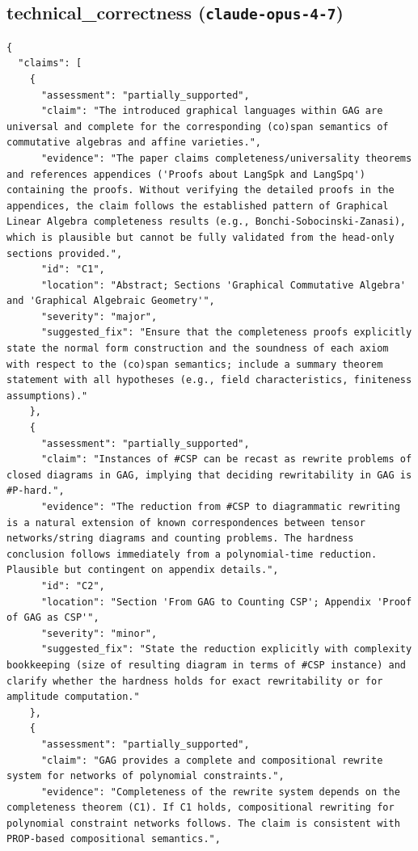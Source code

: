 \documentclass[11pt]{article}
\begin{document}
\subsection*{technical_correctness (\texttt{claude-opus-4-7})}
\begin{verbatim}
{
  "claims": [
    {
      "assessment": "partially_supported",
      "claim": "The introduced graphical languages within GAG are universal and complete for the corresponding (co)span semantics of commutative algebras and affine varieties.",
      "evidence": "The paper claims completeness/universality theorems and references appendices ('Proofs about LangSpk and LangSpq') containing the proofs. Without verifying the detailed proofs in the appendices, the claim follows the established pattern of Graphical Linear Algebra completeness results (e.g., Bonchi-Sobocinski-Zanasi), which is plausible but cannot be fully validated from the head-only sections provided.",
      "id": "C1",
      "location": "Abstract; Sections 'Graphical Commutative Algebra' and 'Graphical Algebraic Geometry'",
      "severity": "major",
      "suggested_fix": "Ensure that the completeness proofs explicitly state the normal form construction and the soundness of each axiom with respect to the (co)span semantics; include a summary theorem statement with all hypotheses (e.g., field characteristics, finiteness assumptions)."
    },
    {
      "assessment": "partially_supported",
      "claim": "Instances of #CSP can be recast as rewrite problems of closed diagrams in GAG, implying that deciding rewritability in GAG is #P-hard.",
      "evidence": "The reduction from #CSP to diagrammatic rewriting is a natural extension of known correspondences between tensor networks/string diagrams and counting problems. The hardness conclusion follows immediately from a polynomial-time reduction. Plausible but contingent on appendix details.",
      "id": "C2",
      "location": "Section 'From GAG to Counting CSP'; Appendix 'Proof of GAG as CSP'",
      "severity": "minor",
      "suggested_fix": "State the reduction explicitly with complexity bookkeeping (size of resulting diagram in terms of #CSP instance) and clarify whether the hardness holds for exact rewritability or for amplitude computation."
    },
    {
      "assessment": "partially_supported",
      "claim": "GAG provides a complete and compositional rewrite system for networks of polynomial constraints.",
      "evidence": "Completeness of the rewrite system depends on the completeness theorem (C1). If C1 holds, compositional rewriting for polynomial constraint networks follows. The claim is consistent with PROP-based compositional semantics.",

\end{verbatim}
\end{document}
